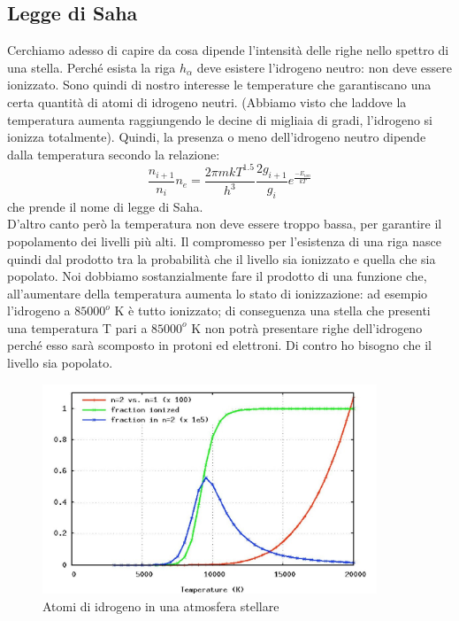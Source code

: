 \documentclass[a4paper,11pt]{article}
\begin{document}
    \subsection{Legge di Saha}
    Cerchiamo adesso di capire da cosa dipende l'intensità delle righe nello spettro di una stella. Perché esista la riga $h_{\alpha}$ deve esistere l'idrogeno neutro: non deve essere ionizzato. Sono quindi di nostro interesse le temperature che garantiscano una certa quantità di atomi di idrogeno neutri. (Abbiamo visto che laddove la temperatura aumenta raggiungendo le decine di migliaia di gradi, l'idrogeno si ionizza totalmente). Quindi, la presenza o meno dell'idrogeno neutro dipende dalla temperatura secondo la relazione:
    $$
        \frac{n_{i+1}}{n_i} n_e = \frac{{2{\pi}mkT}^{1.5}}{h^3} \frac{2g_{i+1}}{g_i} e^{\frac{-E_{ion}}{kT}} 
    $$
    che prende il nome di legge di Saha.\\ D'altro canto però la temperatura non deve essere troppo bassa, per garantire il popolamento dei livelli più alti. Il compromesso per l'esistenza di una riga nasce quindi dal prodotto tra la probabilità che il livello sia ionizzato e quella che sia popolato. Noi dobbiamo sostanzialmente fare il prodotto di una funzione che, all'aumentare della temperatura aumenta lo stato di ionizzazione: ad esempio l'idrogeno a $85000^o$ K è tutto ionizzato; di conseguenza una stella che presenti una temperatura T pari a $85000^o$ K non potrà presentare righe dell'idrogeno perché esso sarà scomposto in protoni ed elettroni. Di contro ho bisogno che il livello sia popolato.\\

      \begin{figure}[h!!]
        \centering
        \includegraphics[width=10cm]{Saha.jpg}
        \caption{Atomi di idrogeno in una atmosfera stellare}
        \label{fig:Boltzmann*Saha }
      \end{figure}
\end{document}
